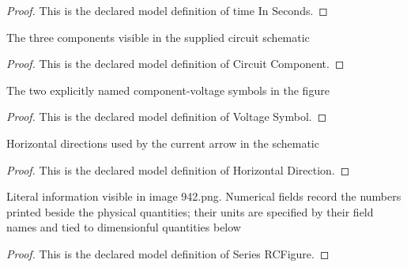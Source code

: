 \begin{proof}
  This is the declared model definition of time In Seconds.
\end{proof}
\begin{definition}
  \label{def:physics:phyx-mini-0942:phyxminiproblems-problemphyxmini0942-circuitcomponent}
  The three components visible in the supplied circuit schematic
\end{definition}
\begin{proof}
  This is the declared model definition of Circuit Component.
\end{proof}
\begin{definition}
  \label{def:physics:phyx-mini-0942:phyxminiproblems-problemphyxmini0942-voltagesymbol}
  The two explicitly named component-voltage symbols in the figure
\end{definition}
\begin{proof}
  This is the declared model definition of Voltage Symbol.
\end{proof}
\begin{definition}
  \label{def:physics:phyx-mini-0942:phyxminiproblems-problemphyxmini0942-horizontaldirection}
  Horizontal directions used by the current arrow in the schematic
\end{definition}
\begin{proof}
  This is the declared model definition of Horizontal Direction.
\end{proof}
\begin{definition}
  \label{def:physics:phyx-mini-0942:phyxminiproblems-problemphyxmini0942-seriesrcfigure}
  Literal information visible in image 942.png. Numerical fields record the numbers printed beside the physical quantities; their units are specified by their field names and tied to dimensionful quantities below
\end{definition}
\begin{proof}
  This is the declared model definition of Series RCFigure.
\end{proof}
